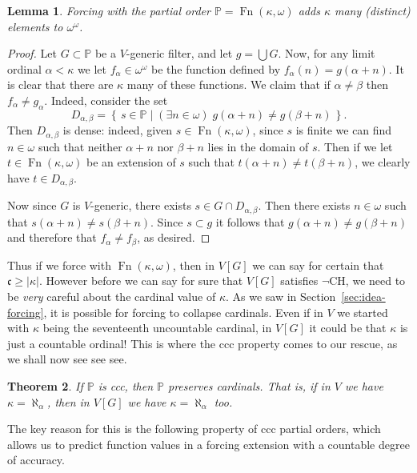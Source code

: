 \documentclass[11pt,oneside]{amsbook}
\newcommand{\set}[1]{\left\{\,#1\,\right\}}
\newcommand{\PP}{\mathbb P}
\DeclareMathOperator{\Fn}{Fn}
\theoremstyle{definition}
\theoremstyle{plain}
\newtheorem{theorem}{Theorem}[section]
\newtheorem{lemma}[theorem]{Lemma}
\theoremstyle{definition}
\theoremstyle{remark}
\numberwithin{equation}{section}
\numberwithin{figure}{section}
\begin{document}
\begin{lemma}
  Forcing with the partial order $\PP=\Fn(\kappa,\omega)$ adds $\kappa$ many (distinct) elements to $\omega^\omega$.
\end{lemma}

\begin{proof}
  Let $G\subset\PP$ be a $V$-generic filter, and let $g=\bigcup G$. Now, for any limit ordinal $\alpha<\kappa$ we let $f_\alpha\in\omega^\omega$ be the function defined by $f_\alpha(n)=g(\alpha+n)$. It is clear that there are $\kappa$ many of these functions. We claim that if $\alpha\neq\beta$ then $f_\alpha\neq g_\alpha$. Indeed, consider the set
  \[D_{\alpha,\beta}=\set{s\in\PP\mid (\exists n\in\omega)\;g(\alpha+n)\neq g(\beta+n)}\text{.}
  \]
  Then $D_{\alpha,\beta}$ is dense: indeed, given $s\in\Fn(\kappa,\omega)$, since $s$ is finite we can find $n\in\omega$ such that neither $\alpha+n$ nor $\beta+n$ lies in the domain of $s$. Then if we let $t\in\Fn(\kappa,\omega)$ be an extension of $s$ such that $t(\alpha+n)\neq t(\beta+n)$, we clearly have $t\in D_{\alpha,\beta}$.

  Now since $G$ is $V$-generic, there exists $s\in G\cap D_{\alpha,\beta}$. Then there exists $n\in\omega$ such that $s(\alpha+n)\neq s(\beta+n)$. Since $s\subset g$ it follows that $g(\alpha+n)\neq g(\beta+n)$ and therefore that $f_\alpha\neq f_\beta$, as desired.
\end{proof}

Thus if we force with $\Fn(\kappa,\omega)$, then in $V[G]$ we can say for certain that $\mathfrak c\geq|\kappa|$. However before we can say for sure that $V[G]$ satisfies $\neg$CH, we need to be \emph{very} careful about the cardinal value of $\kappa$. As we saw in Section~\ref{sec:idea-forcing}, it is possible for forcing to collapse cardinals. Even if in $V$ we started with $\kappa$ being the seventeenth uncountable cardinal, in $V[G]$ it could be that $\kappa$ is just a countable ordinal! This is where the ccc property comes to our rescue, as we shall now see see see.

\begin{theorem}
  \label{thm:ccc-preserve}
  If $\PP$ is ccc, then $\PP$ preserves cardinals. That is, if in $V$ we have $\kappa=\aleph_\alpha$, then in $V[G]$ we have $\kappa=\aleph_\alpha$ too.
\end{theorem}

The key reason for this is the following property of ccc partial orders, which allows us to predict function values in a forcing extension with a countable degree of accuracy.
\end{document}
